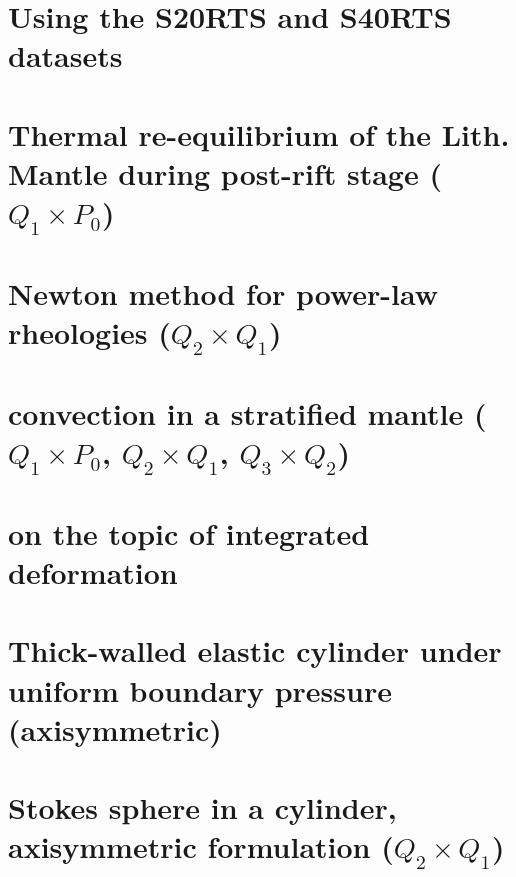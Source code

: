 \documentclass[a4paper,11pt]{report}
\begin{document}
\chapter{Using the S20RTS and S40RTS datasets \label{f85}} %

\chapter{Thermal re-equilibrium of the Lith. Mantle during post-rift stage ($Q_1\times P_0$)\label{f86}} %

\chapter{Newton method for power-law rheologies ($Q_2\times Q_1$) \label{f87}} %

\chapter{convection in a stratified mantle ($Q_1 \times P_0$, $Q_2\times Q_1$, $Q_3\times Q_2$) \label{f88}} %

\chapter{on the topic of integrated deformation	\label{f89}} %

\chapter{Thick-walled elastic cylinder under uniform boundary pressure (axisymmetric) \label{f90}} %

\chapter{Stokes sphere in a cylinder, axisymmetric formulation ($Q_2\times Q_1$) \label{f91}} %
\end{document}
